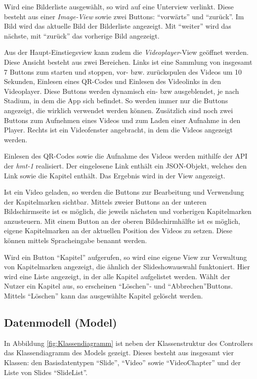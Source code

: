 Wird eine Bilderliste ausgewählt, so wird auf eine Unterview verlinkt. Diese besteht aus einer \emph{Image-View} sowie zwei Buttons: \enquote{vorwärts} und \enquote{zurück}. Im Bild wird das aktuelle Bild der Bilderliste angezeigt. Mit \enquote{weiter} wird das nächste, mit \enquote{zurück} das vorherige Bild angezeigt.

Aus der Haupt-Einstiegsview kann zudem die \emph{Videoplayer}-View geöffnet werden. Diese Ansicht besteht aus zwei Bereichen. Links ist eine Sammlung von insgesamt 7 Buttons zum starten und stoppen, vor- bzw. zurückspulen des Videos um 10 Sekunden, Einlesen eines QR-Codes und Einlesen des Videolinks in den Videoplayer. Diese Buttons werden dynamisch ein- bzw ausgeblendet, je nach Stadium, in dem die App sich befindet. So werden immer nur die Buttons angezeigt, die wirklich verwendet werden können. Zusätzlich sind noch zwei Buttons zum Aufnehmen eines Videos und zum Laden einer Aufnahme in den Player. Rechts ist ein Videofenster angebracht, in dem die Videos angezeigt werden.

Einlesen des QR-Codes sowie die Aufnahme des Videos werden mithilfe der API der \emph{hmt-1} realisiert. Der eingelesene Link enthält ein JSON-Objekt, welches den Link sowie die Kapitel enthält. Das Ergebnis wird in der View angezeigt.

Ist ein Video geladen, so werden die Buttons zur Bearbeitung und Verwendung der Kapitelmarken sichtbar. Mittels zweier Buttons an der unteren Bildschirmseite ist es möglich, die jeweils nächsten und vorherigen Kapitelmarken anzusteuern. Mit einem Button an der oberen Bildschirmhälfte ist es möglich, eigene Kapitelmarken an der aktuellen Position des Videos zu setzen. Diese können mittels Spracheingabe benannt werden.

Wird ein Button \enquote{Kapitel} aufgerufen, so wird eine eigene View zur Verwaltung von Kapitelmarken angezeigt, die ähnlich der Slideshowauswahl funktoniert. Hier wird eine Liste angezeigt, in der alle Kapitel aufgelistet werden. Wählt der Nutzer ein Kapitel aus, so erscheinen \enquote{Löschen}- und \enquote{Abbrechen}Buttons. Mittels \enquote{Löschen} kann das ausgewählte Kapitel gelöscht werden. 
%
%
\subsection{Datenmodell (Model)}
\label{sec:Datenmodell}
In Abbildung \ref{fig:Klassendiagramm} ist neben der Klassenstruktur des Controllers das Klassendiagramm des Models gezeigt. Dieses besteht aus insgesamt vier Klassen: den Basisdatentypen \enquote{Slide}, \enquote{Video} sowie \enquote{VideoChapter} und der Liste von Slides \enquote{SlideList}. 

